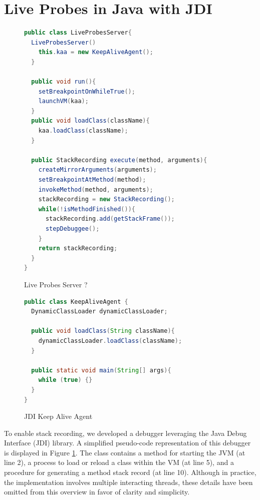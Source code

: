 \documentclass[english,submission]{programming}
\begin{document}
\section{Live Probes in Java with JDI}
\label{sec:live-probes-java}
\begin{figure}[htbp]
  \centering
  \begin{lstlisting}[language=Java]
public class LiveProbesServer{
  LiveProbesServer()
    this.kaa = new KeepAliveAgent();
  }

  public void run(){
    setBreakpointOnWhileTrue();
    launchVM(kaa);
  }
  public void loadClass(className){
    kaa.loadClass(className);
  }

  public StackRecording execute(method, arguments){
    createMirrorArguments(arguments);
    setBreakpointAtMethod(method);
    invokeMethod(method, arguments);
    stackRecording = new StackRecording();
    while(!isMethodFinished()){
      stackRecording.add(getStackFrame());
      stepDebuggee();
    }
    return stackRecording;
  }
}
  \end{lstlisting}
  \caption{Live Probes Server ?}
  \label{fig:debugger-class}
\end{figure}

\begin{figure}[htbp]
  \centering
  \begin{lstlisting}[language=Java]
public class KeepAliveAgent {
  DynamicClassLoader dynamicClassLoader;

  public void loadClass(String className){
    dynamicClassLoader.loadClass(className);
  }

  public static void main(String[] args){
    while (true) {}
  }
}
  \end{lstlisting}
  \caption{JDI Keep Alive Agent}
  \label{fig:java-keep-alive-agent}
\end{figure}

To enable stack recording, we developed a debugger leveraging the Java Debug Interface (JDI) library. 
A simplified pseudo-code representation of this debugger is displayed in Figure \ref{fig:debugger-class}. 
The class contains a method for starting the JVM (at line 2), a process to load or reload a class within the VM (at line 5), and a procedure for generating a method stack record (at line 10). 
Although in practice, the implementation involves multiple interacting threads, these details have been omitted from this overview in favor of clarity and simplicity.
\end{document}
